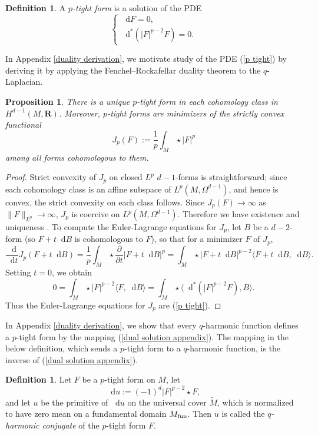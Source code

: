 \documentclass[reqno,11pt]{amsart}
\newcommand{\RR}{\mathbf{R}}
\newcommand*\dif{\mathop{}\!\mathrm{d}}
\newcommand{\dfn}[1]{\emph{#1}\index{#1}}
\newtheorem{proposition}[theorem]{Proposition}
\theoremstyle{definition}
\newtheorem{definition}[theorem]{Definition}
\numberwithin{equation}{section}
\begin{document}
\begin{definition}
A \dfn{$p$-tight form} is a solution of the PDE 
\begin{equation}\label{p tight}
\begin{cases}
\dif F = 0, \\ 
\dif^*(|F|^{p - 2} F) = 0.
\end{cases}
\end{equation}
\end{definition} 

In Appendix \ref{duality derivation}, we motivate study of the PDE (\ref{p tight}) by deriving it by applying the Fenchel--Rockafellar duality theorem to the $q$-Laplacian.

\begin{proposition}
There is a unique $p$-tight form in each cohomology class in $H^{d - 1}(M, \RR)$.
Moreover, $p$-tight forms are minimizers of the strictly convex functional
$$J_p(F) := \frac{1}{p} \int_M \star |F|^p$$
among all forms cohomologous to them.
\end{proposition}
\begin{proof}
Strict convexity of $J_p$ on closed $L^p$ $d - 1$-forms is straightforward; since each cohomology class is an affine subspace of $L^p(M, \Omega^{d - 1})$, and hence is convex, the strict convexity on each class follows.
Since $J_p(F) \to \infty$ as $\|F\|_{L^p} \to \infty$, $J_p$ is coercive on $L^p(M, \Omega^{d - 1})$.
Therefore we have existence and uniqueness \cite[Chapter II]{Ekeland99}.
To compute the Euler-Lagrange equations for $J_p$, let $B$ be a $d-2$-form (so $F + t \dif B$ is cohomologous to $F$), so that for a minimizer $F$ of $J_p$,
$$\frac{\dif}{\dif t} J_p(F + t \dif B) = \frac{1}{p} \int_M \star \frac{\partial}{\partial t} |F + t \dif B|^p = \int_M \star |F + t \dif B|^{p - 2} \langle F + t \dif B, \dif B\rangle.$$
Setting $t = 0$, we obtain 
$$0 = \int_M \star |F|^{p - 2} \langle F, \dif B\rangle = \int_M \star \langle \dif^*(|F|^{p - 2} F), B\rangle.$$
Thus the Euler-Lagrange equations for $J_p$ are (\ref{p tight}).
\end{proof}

In Appendix \ref{duality derivation}, we show that every $q$-harmonic function defines a $p$-tight form by the mapping (\ref{dual solution appendix}).
The mapping in the below definition, which sends a $p$-tight form to a $q$-harmonic function, is the inverse of (\ref{dual solution appendix}).

\begin{definition}
Let $F$ be a $p$-tight form on $M$, let
\begin{equation}
\dif u := (-1)^d |F|^{p - 2} \star F, \label{inverse extremality}
\end{equation}
and let $u$ be the primitive of $\dif u$ on the universal cover $\tilde M$, which is normalized to have zero mean on a fundamental domain $M_{\rm fun}$.
Then $u$ is called the \dfn{$q$-harmonic conjugate} of the $p$-tight form $F$.
\end{definition}
\end{document}
